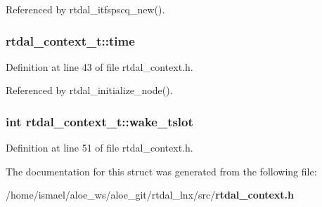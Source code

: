 Referenced by rtdal\-\_\-itfspscq\-\_\-new().

\subsubsection[{time}]{ rtdal\-\_\-context\-\_\-t\-::time}\label{structrtdal__context__t_a8b7974854cfddeeb16a0b687124a8d34}


Definition at line 43 of file rtdal\-\_\-context.\-h.



Referenced by rtdal\-\_\-initialize\-\_\-node().

\subsubsection[{wake\-\_\-tslot}]{\setlength{\rightskip}{0pt plus 5cm}int rtdal\-\_\-context\-\_\-t\-::wake\-\_\-tslot}\label{structrtdal__context__t_abfb7860ff2fbfc31358676c27ec2fbce}


Definition at line 51 of file rtdal\-\_\-context.\-h.



The documentation for this struct was generated from the following file\-:\begin{DoxyCompactItemize}
\item 
/home/ismael/aloe\-\_\-ws/aloe\-\_\-git/rtdal\-\_\-lnx/src/{\bf rtdal\-\_\-context.\-h}\end{DoxyCompactItemize}
